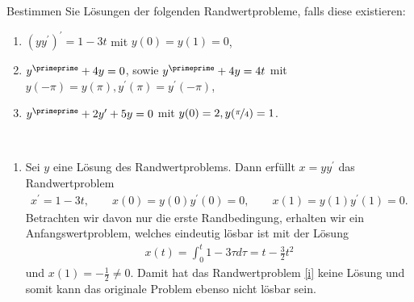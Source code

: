 \begin{exercise}
Bestimmen Sie Lösungen der folgenden Randwertprobleme, falls diese existieren:
\begin{enumerate}[label = \textbf{\alph*)}]
  \item $(yy^{\prime})^{\prime} = 1 - 3t$ mit $y(0) = y(1) = 0$,
  \item $y^{\primeprime} + 4y = 0$, sowie $y^{\primeprime} + 4y = 4t$ mit
  $y(-\pi) = y(\pi), y^{\prime}(\pi) = y^{\prime}(-\pi)$,
  \item $y^{\primeprime} + 2y^{\prime} + 5y = 0$ mit $y(0) = 2, y(\nicefrac{\pi}{4}) = 1$.
\end{enumerate}
\end{exercise}
\begin{solution}
\leavevmode \\
\begin{enumerate}[label = \textbf{\alph*)}]
  \item Sei $y$ eine Lösung des Randwertproblems. Dann erfüllt
  $x = yy^{\prime}$ das Randwertproblem
  \begin{align}\label{i}
    x^{\prime} = 1 - 3t, \qquad x(0) = y(0)y^{\prime}(0) = 0, \qquad x(1) = y(1)y^{\prime}(1) = 0.
  \end{align}
  Betrachten wir davon nur die erste Randbedingung, erhalten wir ein Anfangswertproblem,
  welches eindeutig lösbar ist mit der Lösung
  \begin{align*}
    x(t) = \int_0^t 1 -3\tau d\tau = t - \frac{3}{2}t^2
  \end{align*}
  und $x(1) = -\frac{1}{2} \neq 0$. Damit hat das Randwertproblem \eqref{i}
  keine Lösung und somit kann das originale Problem ebenso nicht lösbar sein.


\end{enumerate}
\end{solution}
